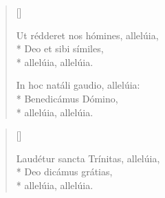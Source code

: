 \begin{verse}[\versewidth]


 Ut rédderet nos hómines, allelúia,\\*
Deo et sibi símiles,\\*
\vin allelúia, allelúia.


 In hoc natáli gaudio, allelúia:\\*
Benedicámus Dómino,\\*
\vin allelúia, allelúia.

\end{verse}

\begin{verse}[\versewidth]


 Laudétur sancta Trínitas, allelúia,\\*
Deo dicámus grátias,\\*
\vin allelúia, allelúia.

\end{verse}

